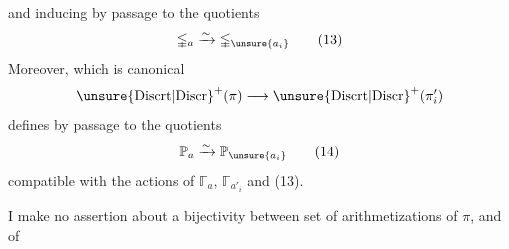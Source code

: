 
and inducing by passage to the quotients
\[
\mathbb{\Gamma}_a\xrightarrow{\sim}
\mathbb{\Gamma}_{\unsure{a_i}}
\tag{13}
\]
Moreover, \uline{} which is canonical
\[
\unsure{\mathrm{Discrt}|\mathrm{Discr}}^{+}(\pi)\longrightarrow
\unsure{\mathrm{Discrt}|\mathrm{Discr}}^{+}(\pi'_i)
\]
defines by passage to the quotients
\[
\mathbb{P}_a\xrightarrow{\sim}\mathbb{P}_{\unsure{a_i}}
\tag{14}
\]
compatible with the actions of $\mathbb{\Gamma}_a$,
$\mathbb{\Gamma}_{a'_i}$ and (13).

I make  no assertion about
a  bijectivity between
set of arithmetizations of $\pi$, and  of